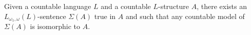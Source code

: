 Given a countable language $L$ and a countable $L$-structure $A$, there exists an $L_{\omega_1,\omega}(L)$-sentence $\Sigma(A)$ true in $A$ and such that any countable model of $\Sigma(A)$ is isomorphic to $A$.
